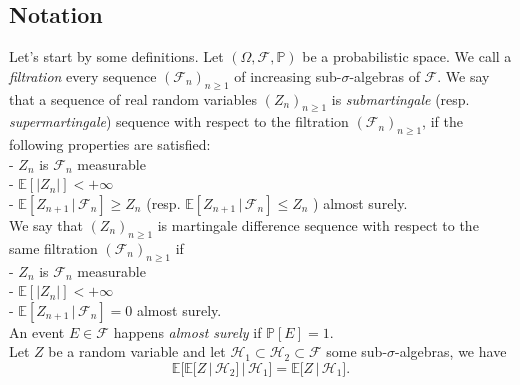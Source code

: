 \documentclass{article}
\begin{document}
\subsection{Notation}
Let's start by some definitions. Let $(\Omega, \mathcal{F}, \mathbb{P})$ be a probabilistic space. We call a \textit{filtration} every sequence $(\mathcal{F}_n)_{n \geqslant 1}$ of increasing sub-$\sigma$-algebras of $\mathcal{F}$. We say that a sequence of real random variables $(Z_n)_{n \geqslant 1}$ is \textit{submartingale} (resp. \textit{supermartingale}) sequence with respect to the filtration $(\mathcal{F}_n)_{n \geqslant 1}$, if the following properties are satisfied:\\
- $Z_n$ is $\mathcal{F}_n$ measurable\\
- $\mathbb{E}[|Z_n|]< +\infty$\\
- $\mathbb{E}[Z_{n+1} \, | \, \mathcal{F}_n] \geqslant Z_n$ (resp. $\mathbb{E}[Z_{n+1}\, | \,\mathcal{F}_n] \leqslant  Z_n$ ) almost surely.\\
We say that $(Z_n)_{n \geqslant 1}$ is martingale difference sequence with respect to the same filtration $(\mathcal{F}_n)_{n \geqslant 1}$ if \\
- $Z_n$ is $\mathcal{F}_n$ measurable\\
- $\mathbb{E}[|Z_n|]< +\infty$\\
- $\mathbb{E}[Z_{n+1} \, | \,\mathcal{F}_n] =0$ almost surely.\\
An event $ E \in \mathcal{F}$ happens \textit{almost surely} if  $\mathbb{P}[E]=1$. \\
Let $Z$ be a random variable and let $\mathcal{H}_1\subset \mathcal{H}_2 \subset \mathcal{F}$ some sub-$\sigma$-algebras,  we have
$$
\mathbb{E}\big[ \mathbb{E}\big[ Z \, \big| \,\mathcal{H}_2 \big] \,\big| \, \mathcal{H}_1  \big]=\mathbb{E}\big[ Z\, \big| \, \mathcal{H}_1 \big].
$$
\end{document}
